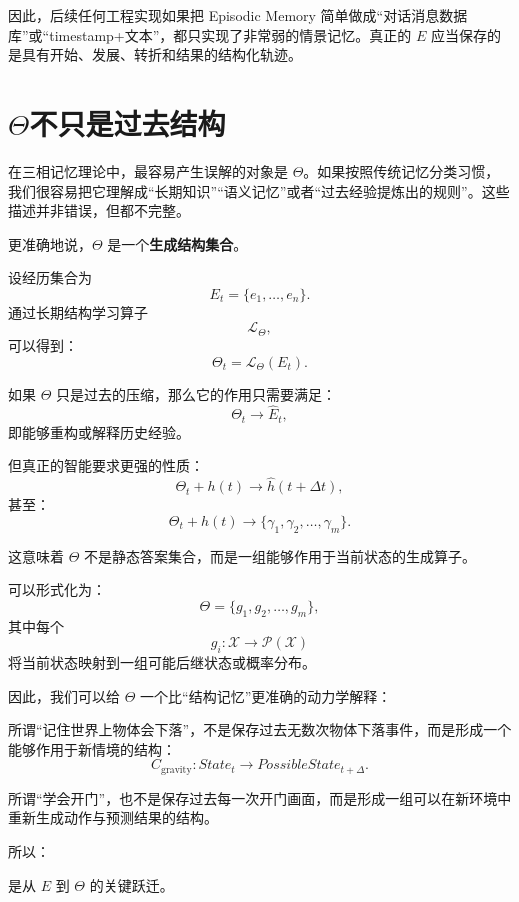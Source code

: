 因此，后续任何工程实现如果把 Episodic Memory 简单做成“对话消息数据库”或“timestamp+文本”，都只实现了非常弱的情景记忆。真正的 \(E\) 应当保存的是具有开始、发展、转折和结果的结构化轨迹。

\section{\texorpdfstring{$\Theta$}{Theta}不只是过去结构}

在三相记忆理论中，最容易产生误解的对象是 \(\Theta\)。如果按照传统记忆分类习惯，我们很容易把它理解成“长期知识”“语义记忆”或者“过去经验提炼出的规则”。这些描述并非错误，但都不完整。

更准确地说，\(\Theta\) 是一个\textbf{生成结构集合}。

设经历集合为
\[
E_t=\{e_1,\ldots,e_n\}.
\]
通过长期结构学习算子
\[
\mathcal L_\Theta,
\]
可以得到：
\[
\Theta_t
=
\mathcal L_\Theta(E_t).
\]

如果 \(\Theta\) 只是过去的压缩，那么它的作用只需要满足：
\[
\Theta_t
\rightarrow
\widehat E_t,
\]
即能够重构或解释历史经验。

但真正的智能要求更强的性质：
\[
\Theta_t
+
h(t)
\rightarrow
\widehat h(t+\Delta t),
\]
甚至：
\[
\Theta_t
+
h(t)
\rightarrow
\{\gamma_1,\gamma_2,\ldots,\gamma_m\}.
\]

这意味着 \(\Theta\) 不是静态答案集合，而是一组能够作用于当前状态的生成算子。

可以形式化为：
\[
\Theta
=
\{
g_1,g_2,\ldots,g_m
\},
\]
其中每个
\[
g_i:
\mathcal X
\rightarrow
\mathcal P(\mathcal X)
\]
将当前状态映射到一组可能后继状态或概率分布。

因此，我们可以给 \(\Theta\) 一个比“结构记忆”更准确的动力学解释：
\begin{statementbox}
\centering
{}
\end{statementbox}

所谓“记住世界上物体会下落”，不是保存过去无数次物体下落事件，而是形成一个能够作用于新情境的结构：
\[
C_{\mathrm{gravity}}
:
State_t
\rightarrow
PossibleState_{t+\Delta}.
\]

所谓“学会开门”，也不是保存过去每一次开门画面，而是形成一组可以在新环境中重新生成动作与预测结果的结构。

所以：

\begin{statementbox}
\centering
{}
\end{statementbox}
是从 \(E\) 到 \(\Theta\) 的关键跃迁。

